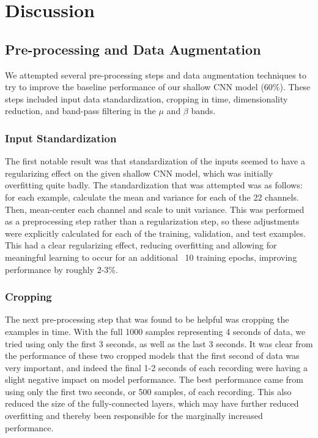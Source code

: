 \documentclass[10pt,twocolumn,letterpaper]{article}
\begin{document}
\section{Discussion}
\subsection{Pre-processing and Data Augmentation}
We attempted several pre-processing steps and data augmentation techniques to
try to improve the baseline performance of our shallow CNN model (60\%).
These steps included input data standardization, cropping in time,
dimensionality reduction, and band-pass filtering in the $\mu$ and $\beta$
bands.

\subsubsection{Input Standardization}
The first notable result was that standardization of the inputs seemed to have a
regularizing effect on the given shallow CNN model, which was initially
overfitting quite badly. The standardization that was attempted was as follows:
for each example, calculate the mean and variance for each of the 22 channels. 
Then, mean-center each channel and scale to unit variance. This was performed as
a preprocessing step rather than a regularization step, so these adjustments
were explicitly calculated for each of the training, validation, and test
examples. This had a clear regularizing effect, reducing overfitting and
allowing for meaningful learning to occur for an additional ~10 training epochs,
improving performance by roughly 2-3\%.

\subsubsection{Cropping}
The next pre-processing step that was found to be helpful was cropping the
examples in time. With the full 1000 samples representing 4 seconds of data, we
tried using only the first 3 seconds, as well as the last 3 seconds. It was
clear from the performance of these two cropped models that the first second of
data was very important, and indeed the final 1-2 seconds of each recording were
having a slight negative impact on model performance. The best performance came
from using only the first two seconds, or 500 samples, of each recording. This
also reduced the size of the fully-connected layers, which may have further
reduced overfitting and thereby been responsible for the marginally increased
performance.
\end{document}
